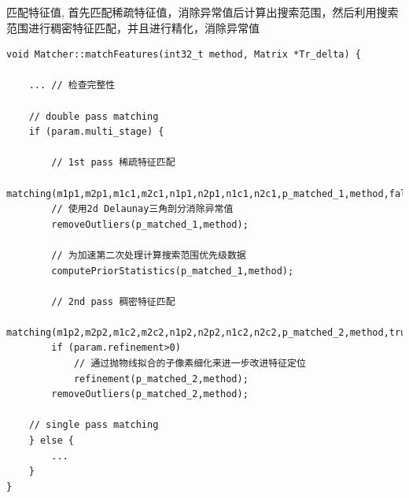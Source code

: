 \documentclass[UTF8]{ctexart}
\begin{document}
    匹配特征值, 首先匹配稀疏特征值，消除异常值后计算出搜索范围，然后利用搜索范围进行稠密特征匹配，并且进行精化，消除异常值
    \begin{verbatim}
void Matcher::matchFeatures(int32_t method, Matrix *Tr_delta) {

    ... // 检查完整性

    // double pass matching
    if (param.multi_stage) {

        // 1st pass 稀疏特征匹配
        matching(m1p1,m2p1,m1c1,m2c1,n1p1,n2p1,n1c1,n2c1,p_matched_1,method,false,Tr_delta);
        // 使用2d Delaunay三角剖分消除异常值
        removeOutliers(p_matched_1,method);
        
        // 为加速第二次处理计算搜索范围优先级数据
        computePriorStatistics(p_matched_1,method);      

        // 2nd pass 稠密特征匹配
        matching(m1p2,m2p2,m1c2,m2c2,n1p2,n2p2,n1c2,n2c2,p_matched_2,method,true,Tr_delta);
        if (param.refinement>0)
            // 通过抛物线拟合的子像素细化来进一步改进特征定位
            refinement(p_matched_2,method);
        removeOutliers(p_matched_2,method);

    // single pass matching
    } else {
        ...
    }
}
    \end{verbatim}
\end{document}
